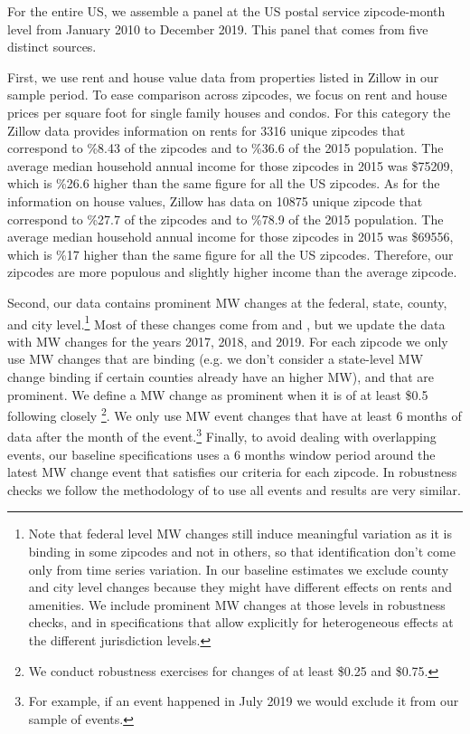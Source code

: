 For the entire US, we assemble a panel at the US postal service zipcode-month level from January 2010 to December 2019. This panel that comes from five distinct sources. 

First, we use rent and house value data from properties listed in Zillow \parencite{zillow} in our sample period. 
To ease comparison across zipcodes, we focus on rent and house prices per square foot for single family houses and condos. For this category the Zillow data provides information on rents for 3316 unique zipcodes that correspond to \%8.43 of the zipcodes and to \%36.6 of the 2015 population. The average median household annual income for those zipcodes in 2015 was \$75209, which is \%26.6 higher than the same figure for all the US zipcodes. As for the information on house values, Zillow has data on 10875 unique zipcode that correspond to \%27.7 of the zipcodes and to \%78.9 of the 2015 population. The average median household annual income for those zipcodes in 2015 was \$69556, which is \%17 higher than the same figure for all the US zipcodes. Therefore, our zipcodes are more populous and slightly higher income than the average zipcode. 

Second, our data contains prominent MW changes at the federal, state, county, and city level.\footnote{Note that federal level MW changes still induce meaningful variation as it is binding in some zipcodes and not in others, so that identification don't come only from time series variation. In our baseline estimates we exclude county and city level changes because they might have different effects on rents and amenities. We include prominent MW changes at those levels in robustness checks, and in specifications that allow explicitly for heterogeneous effects at the different jurisdiction levels.} Most of these changes come from \textcite{vaghul2016historical} and \textcite{cengiz2019effect}, but we update the data with MW changes for the years 2017, 2018, and 2019. For each zipcode we only use MW changes that are binding (e.g. we don't consider a state-level MW change binding if certain counties already have an higher MW), and that are prominent. We define a MW change as prominent when it is of at least \$0.5 following closely \textcite{cengiz2019effect}\footnote{We conduct robustness exercises for changes of at least \$0.25 and \$0.75.}. We only use MW event changes that have at least 6 months of data after the month of the event.\footnote{For example, if an event happened in July 2019 we would exclude it from our sample of events.} Finally, to avoid dealing with overlapping events, our baseline specifications uses a 6 months window period around the latest MW change event that satisfies our criteria for each zipcode. In robustness checks we follow the methodology of \textcite{cengiz2019effect} to use all events and results are very similar.


